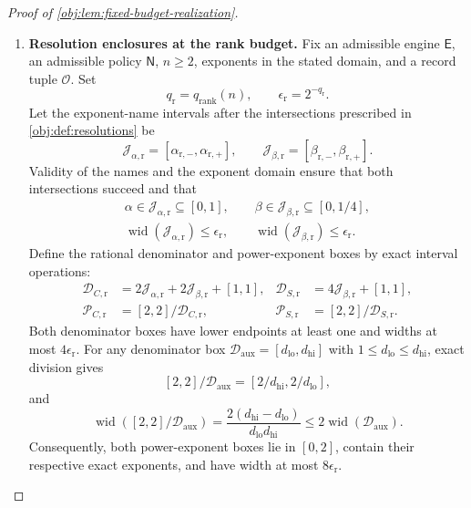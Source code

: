 \begin{proof}[Proof of \cref{obj:lem:fixed-budget-realization}]
\begin{enumerate}
\item \textbf{Resolution enclosures at the rank budget.}
Fix an admissible engine \(\mathsf E\), an admissible policy \(\mathsf N\), \(n\ge2\), exponents in the stated domain, and a record tuple \(\mathcal O\). Set
\[
q_{\mathrm r}=q_{\mathrm{rank}}(n),
\qquad
\epsilon_{\mathrm r}=2^{-q_{\mathrm r}}.
\]
Let the exponent-name intervals after the intersections prescribed in \cref{obj:def:resolutions} be
\[
\mathcal J_{\alpha,\mathrm r}
=[\alpha_{\mathrm r,-},\alpha_{\mathrm r,+}],
\qquad
\mathcal J_{\beta,\mathrm r}
=[\beta_{\mathrm r,-},\beta_{\mathrm r,+}].
\]
Validity of the names and the exponent domain ensure that both intersections succeed and that
\[
\begin{gathered}
\alpha\in\mathcal J_{\alpha,\mathrm r}\subseteq[0,1],
\qquad
\beta\in\mathcal J_{\beta,\mathrm r}\subseteq[0,1/4],\\
\operatorname{wid}(\mathcal J_{\alpha,\mathrm r})\le\epsilon_{\mathrm r},
\qquad
\operatorname{wid}(\mathcal J_{\beta,\mathrm r})\le\epsilon_{\mathrm r}.
\end{gathered}
\]
Define the rational denominator and power-exponent boxes by exact interval operations:
\[
\begin{aligned}
\mathcal D_{C,\mathrm r}
&=2\mathcal J_{\alpha,\mathrm r}
  +2\mathcal J_{\beta,\mathrm r}+[1,1],
&
\mathcal D_{S,\mathrm r}
&=4\mathcal J_{\beta,\mathrm r}+[1,1],\\
\mathcal P_{C,\mathrm r}
&=[2,2]/\mathcal D_{C,\mathrm r},
&
\mathcal P_{S,\mathrm r}
&=[2,2]/\mathcal D_{S,\mathrm r}.
\end{aligned}
\]
Both denominator boxes have lower endpoints at least one and widths at most \(4\epsilon_{\mathrm r}\). For any denominator box
\(\mathcal D_{\mathrm{aux}}=[d_{\mathrm{lo}},d_{\mathrm{hi}}]\) with
\(1\le d_{\mathrm{lo}}\le d_{\mathrm{hi}}\), exact division gives
\[
[2,2]/\mathcal D_{\mathrm{aux}}
=
[2/d_{\mathrm{hi}},2/d_{\mathrm{lo}}],
\]
and
\[
\operatorname{wid}([2,2]/\mathcal D_{\mathrm{aux}})
=
\frac{2(d_{\mathrm{hi}}-d_{\mathrm{lo}})}
     {d_{\mathrm{lo}}d_{\mathrm{hi}}}
\le2\operatorname{wid}(\mathcal D_{\mathrm{aux}}).
\]
Consequently, both power-exponent boxes lie in \([0,2]\), contain their respective exact exponents, and have width at most \(8\epsilon_{\mathrm r}\).


\end{enumerate}
\end{proof}
